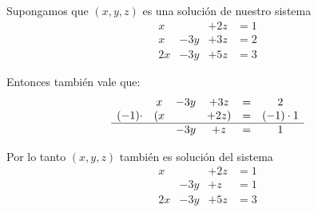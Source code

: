 \documentclass[handout]{beamer} %
\renewcommand{\_}[1]{_{\left( #1 \right)}}
\renewcommand{\^}[1]{^{\left( #1 \right)}}
\begin{document}
\begin{frame}
	
Supongamos que $(x,y,z)$ es una solución de nuestro sistema
\begin{equation*}
\begin{matrix}
x &  & +2z & = 1 \\
x& -3y & +3z & =2 \\
2x& -3y & +5z & =3
\end{matrix}
\end{equation*}

 
Entonces también vale que: 
\begin{equation*}
\begin{matrix}
&x& -3y & +3z & = & 2 \\
(-1)\cdot&(x &  & +2z) & = &(-1)\cdot1 \\
\hline
&& -3y & +z & = & 1  
\end{matrix}
\end{equation*}

  \pause
Por lo tanto $(x,y,z)$ también es solución del sistema
\begin{equation*}
\begin{matrix}
x &  & +2z & = 1 \\
& -3y & +z & = 1   \\
2x& -3y & +5z & =3
\end{matrix}
\end{equation*}
\end{frame}
\end{document}
